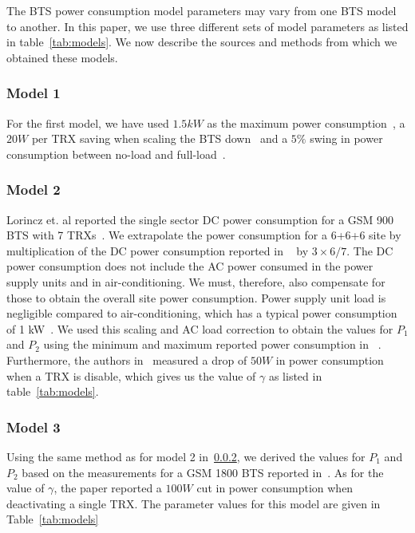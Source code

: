 The BTS power consumption model parameters may vary from one BTS model to another. In this paper, we use three different sets of model parameters as listed in table~\ref{tab:models}. We now describe the sources and methods from which we obtained these models.
\subsubsection{Model 1}
\label{subsubsec:case2:experiments:sitetypes:model1}For the first model, we have used $1.5kW$ as the maximum power consumption~\cite{mbakwe:btshybribpower:2011:necec}, a $20W$ per TRX saving when scaling the BTS down~\cite{flexibsc} and a $5\%$ swing in power consumption between no-load and full-load~\cite{Peng:2011:BTSSaving:Mobicom}.

\subsubsection{Model 2}
\label{subsubsec:case2:experiments:sitetypes:model2} Lorincz et. al reported the single sector DC power consumption for a GSM 900 BTS with 7 TRXs~\cite{Lorincz:BTS-Measure:Sensors:2012}. We extrapolate the power consumption for a 6+6+6 site by multiplication of the DC power consumption reported in ~\cite{Lorincz:BTS-Measure:Sensors:2012} by $3\times6/7$. The DC power consumption does not include the AC power consumed in the power supply units and in air-conditioning. We must, therefore, also compensate for those to obtain the overall site power consumption. Power supply unit load is negligible compared to air-conditioning, which has a typical power consumption of 1 kW~\cite{mbakwe:btshybribpower:2011:necec}. We used this scaling and AC load correction to obtain the values for $P_1$ and $P_2$ using the minimum and maximum reported power consumption in ~\cite{Lorincz:BTS-Measure:Sensors:2012}. Furthermore, the authors in~\cite{Lorincz:BTS-Measure:Sensors:2012} measured a drop of $50W$ in power consumption when a TRX is disable, which gives us the value of $\gamma$ as listed in table~\ref{tab:models}.

\subsubsection{Model 3}
\label{subsubsec:case2:experiments:sitetypes:model3}Using the same method as for model 2 in~\ref{subsubsec:case2:experiments:sitetypes:model2}, we derived the values for $P_1$ and $P_2$ based on the measurements for a GSM 1800 BTS reported in~\cite{Lorincz:BTS-Measure:Sensors:2012}. As for the value of $\gamma$, the paper reported a $100W$ cut in power consumption when deactivating a single TRX. The parameter values for this model are given in Table~\ref{tab:models}

